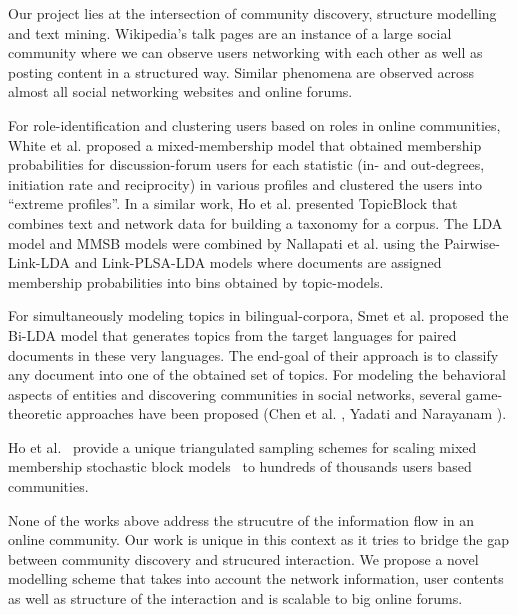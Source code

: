 Our project lies at the intersection of community discovery, structure modelling
and text mining. Wikipedia's talk pages are an instance of a large social
community where we can observe users networking with each other as well as
posting content in a structured way. Similar phenomena are observed across
almost all social networking websites and online forums.


For role-identification and clustering users based on roles in online communities, 
White et al.\cite{ICWSM124638} proposed a mixed-membership model that obtained
membership probabilities for discussion-forum users for each statistic
(in- and out-degrees, initiation rate and reciprocity) in various profiles and 
clustered the users into ``extreme profiles''. In a similar work, Ho et al.
\cite{Ho:2012:DHT:2187836.2187936} presented TopicBlock that combines text and 
network data for building a taxonomy for a corpus. 
The LDA model and MMSB models were combined by
Nallapati et al. \cite{Nallapati:2008:JLT:1401890.1401957} using the
Pairwise-Link-LDA and Link-PLSA-LDA models where documents are assigned
membership probabilities into bins obtained by topic-models.

For simultaneously modeling topics in bilingual-corpora, Smet et al.
\cite{Smet:2011:KTA:2017863.2017915} proposed the Bi-LDA model that generates
topics from the target languages for paired documents in these very languages.
The end-goal of their approach is to classify any document into one of the
obtained set of topics. For modeling the behavioral aspects of entities and
discovering communities in social networks, several game-theoretic approaches
have been proposed (Chen et al. \cite{Chen:2010:GFI:1842547.1842566}, Yadati and
Narayanam \cite{Yadati:2011:GTM:1963192.1963316}).

Ho et al.~\cite{HoYX12} provide a unique triangulated sampling schemes for scaling
mixed membership stochastic block models~\cite{Airoldi:2008:MMS:1390681.1442798} to
hundreds of thousands users based communities.

None of the works above address the strucutre of the information flow in an
online community. Our work is unique in this context as it tries to bridge the
gap between community discovery and strucured interaction. We propose a novel
modelling scheme that takes into account the network information, user contents
as well as structure of the interaction and is scalable to big online forums.
